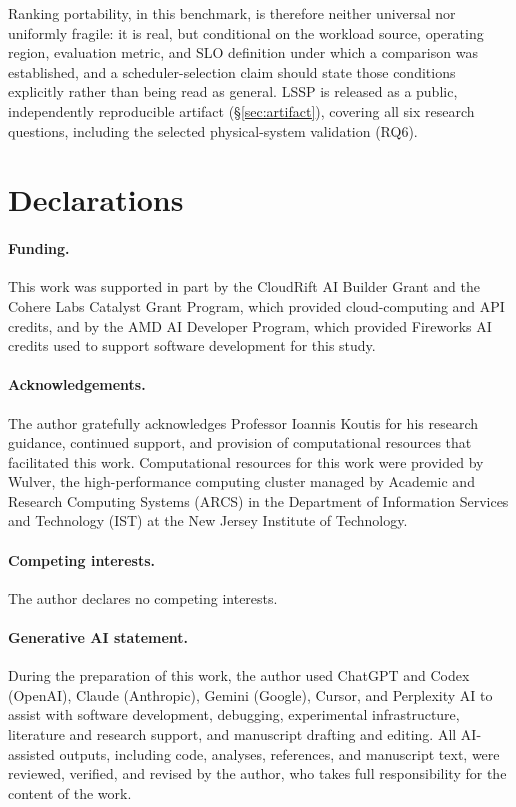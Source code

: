 \documentclass[sn-basic,Numbered,pdflatex]{sn-jnl}
\begin{document}
Ranking portability, in this benchmark, is therefore neither universal nor
uniformly fragile: it is real, but conditional on the workload source,
operating region, evaluation metric, and SLO definition under which a
comparison was established, and a scheduler-selection claim should state
those conditions explicitly rather than being read as general. LSSP is
released as a public, independently reproducible artifact
(\S\ref{sec:artifact}), covering all six research questions, including
the selected physical-system validation (RQ6).

\section*{Declarations}

\paragraph{Funding.}
This work was supported in part by the CloudRift AI Builder Grant and the
Cohere Labs Catalyst Grant Program, which provided cloud-computing and API
credits, and by the AMD AI Developer Program, which provided Fireworks AI
credits used to support software development for this study.

\paragraph{Acknowledgements.} The author gratefully acknowledges Professor
Ioannis Koutis for his research guidance, continued support, and provision
of computational resources that facilitated this work. Computational
resources for this work were provided by Wulver, the high-performance
computing cluster managed by Academic and Research Computing Systems
(ARCS) in the Department of Information Services and Technology (IST) at
the New Jersey Institute of Technology.

\paragraph{Competing interests.} The author declares no competing
interests.

\paragraph{Generative AI statement.} During the preparation of this work,
the author used ChatGPT and Codex (OpenAI), Claude (Anthropic), Gemini
(Google), Cursor, and Perplexity AI to assist with software development,
debugging, experimental infrastructure, literature and research support,
and manuscript drafting and editing. All AI-assisted outputs, including
code, analyses, references, and manuscript text, were reviewed, verified,
and revised by the author, who takes full responsibility for the content
of the work.
\end{document}
